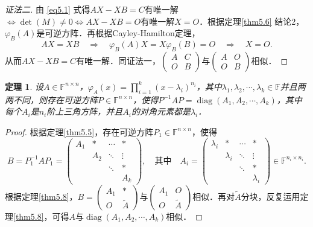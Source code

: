 \documentclass[a4paper,fontset=windows]{ctexbook}
\newtheorem{theorem}{定理}[chapter]
\theoremstyle{definition}
\DeclareMathOperator{\diag}{diag}
\begin{document}
\begin{proof}[证法二]
由 \eqref{eq5.1} 式得$AX-XB=C$有唯一解$\Leftrightarrow\det(M)\ne 0\Leftrightarrow AX-XB=O$有唯一解$X=O$．根据定理\ref{thm5.6} 结论2，$\varphi_B(A)$是可逆方阵．再根据Cayley-Hamilton定理，
$$AX=XB\quad\Rightarrow\quad\varphi_B(A)X=X\varphi_B(B)=O\quad\Rightarrow\quad X=O.$$
从而$AX-XB=C$有唯一解．同证法一，$\begin{pmatrix}A&C \\ O&B\end{pmatrix}$与$\begin{pmatrix}A&O \\ O&B\end{pmatrix}$相似．
\end{proof}

\begin{theorem}\label{thm5.9}
设$A\in\mathbb{F}^{n\times n}$，$\varphi_A(x)=\prod\limits_{i=1}^k(x-\lambda_i)^{n_i}$，其中$\lambda_1,\lambda_2,\cdots,\lambda_k\in\mathbb{F}$并且两两不同，则存在可逆方阵$P\in\mathbb{F}^{n\times n}$，使得$P^{-1}AP=\diag(A_1,A_2,\cdots,A_k)$，其中每个$A_i$是$n_i$阶上三角方阵，并且$A_i$的对角元素都是$\lambda_i$．
\end{theorem}

\begin{proof}
根据定理\ref{thm5.5}，存在可逆方阵$P_1\in\mathbb{F}^{n\times n}$，使得
$$B=P_1^{-1}AP_1=\begin{pmatrix}A_1&*&\cdots&* \\ &A_2&\ddots&\vdots \\ &&\ddots&* \\ &&&A_k\end{pmatrix},\quad\text{其中}\quad A_i=\begin{pmatrix}\lambda_i&*&\cdots&* \\ &\lambda_i&\ddots&\vdots \\ &&\ddots&* \\ &&&\lambda_i\end{pmatrix}\in\mathbb{F}^{n_i\times n_i}.$$
根据定理\ref{thm5.8}，$B=\begin{pmatrix}A_1&* \\ O&\widetilde{A}\end{pmatrix}$与$\begin{pmatrix}A_1&O \\ O&\widetilde{A}\end{pmatrix}$相似．再对$\widetilde{A}$分块，反复运用定理\ref{thm5.8}，可得$A$与$\diag(A_1,A_2,\cdots,A_k)$相似．
\end{proof}
\end{document}
